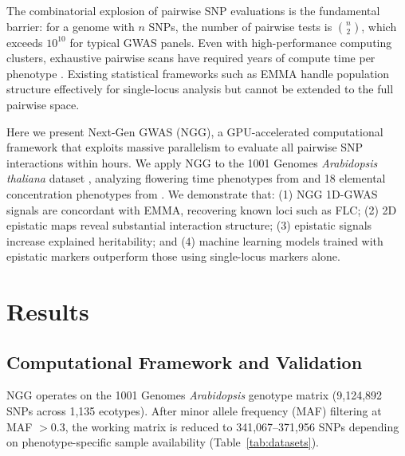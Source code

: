\documentclass[11pt]{article}
\begin{document}
The combinatorial explosion of pairwise SNP evaluations is the fundamental barrier: for a genome with $n$ SNPs, the number of pairwise tests is $\binom{n}{2}$, which exceeds $10^{10}$ for typical GWAS panels. Even with high-performance computing clusters, exhaustive pairwise scans have required years of compute time per phenotype \citep{wei2014detecting, cordell2009detecting}. Existing statistical frameworks such as EMMA \citep{kang2008efficient} handle population structure effectively for single-locus analysis but cannot be extended to the full pairwise space.

Here we present Next-Gen GWAS (NGG), a GPU-accelerated computational framework that exploits massive parallelism to evaluate all pairwise SNP interactions within hours. We apply NGG to the 1001 Genomes \textit{Arabidopsis thaliana} dataset \citep{genomes20111001}, analyzing flowering time phenotypes from \citet{atwell2010genome} and 18 elemental concentration phenotypes from \citet{campos2021ionomics}. We demonstrate that: (1) NGG 1D-GWAS signals are concordant with EMMA, recovering known loci such as FLC; (2) 2D epistatic maps reveal substantial interaction structure; (3) epistatic signals increase explained heritability; and (4) machine learning models trained with epistatic markers outperform those using single-locus markers alone.

\section{Results}

\subsection{Computational Framework and Validation}

NGG operates on the 1001 Genomes \textit{Arabidopsis} genotype matrix (9,124,892 SNPs across 1,135 ecotypes). After minor allele frequency (MAF) filtering at MAF $> 0.3$, the working matrix is reduced to 341,067--371,956 SNPs depending on phenotype-specific sample availability (Table~\ref{tab:datasets}).
\end{document}
